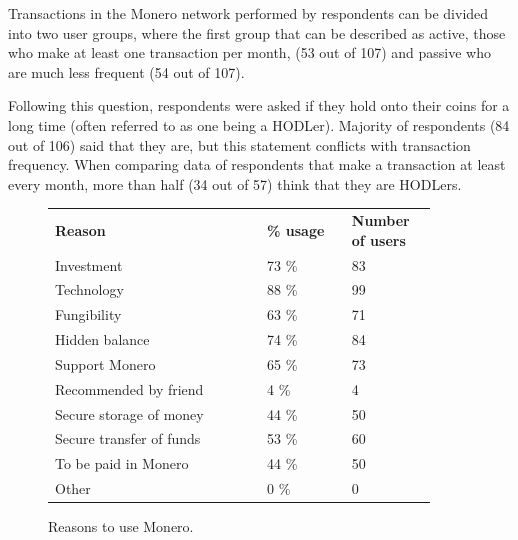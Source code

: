 \documentclass[
  printed, %
  table,   %
  lof,     %
  lot,     %
           oneside, color
]{fithesis3}
\begin{document}
Transactions in the Monero network performed by respondents can be divided into two user groups, where the first group that can be described as active, those who make at least one transaction per month, (53 out of 107) and passive who are much less frequent (54 out of 107). 

Following this question, respondents were asked if they hold onto their coins for a long time (often referred to as one being a HODLer). Majority of respondents (84 out of 106) said that they are, but this statement conflicts with transaction frequency. When comparing data of respondents that make a transaction at least every month, more than half (34 out of 57) think that they are HODLers. 

\begin{figure}[H]
\center
\begin{tabular}{p{0.5\linewidth}p{0.2\linewidth}p{0.2\linewidth}}
\textbf{Reason}          & \textbf{\% usage} & \textbf{Number of users} \\
Investment               & 73 \%             & 83                \\
Technology               & 88 \%             & 99                \\
Fungibility              & 63 \%             & 71                \\
Hidden balance           & 74 \%             & 84                \\
Support Monero           & 65 \%             & 73                \\
Recommended by friend    & 4 \%              & 4                 \\
Secure storage of money  & 44 \%             & 50                \\
Secure transfer of funds & 53 \%             & 60                \\
To be paid in Monero     & 44 \%             & 50                \\
Other                    & 0 \%              & 0                
\end{tabular}
\caption{Reasons to use Monero.}
\label{table:monerousageresearch}
\end{figure}
\end{document}
